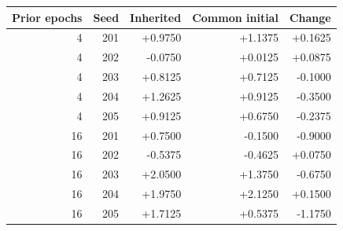 \begin{tabular}{rrrrr}
\toprule
Prior epochs & Seed & Inherited & Common initial & Change\\
\midrule
4 & 201 & +0.9750 & +1.1375 & +0.1625\\
4 & 202 & -0.0750 & +0.0125 & +0.0875\\
4 & 203 & +0.8125 & +0.7125 & -0.1000\\
4 & 204 & +1.2625 & +0.9125 & -0.3500\\
4 & 205 & +0.9125 & +0.6750 & -0.2375\\
16 & 201 & +0.7500 & -0.1500 & -0.9000\\
16 & 202 & -0.5375 & -0.4625 & +0.0750\\
16 & 203 & +2.0500 & +1.3750 & -0.6750\\
16 & 204 & +1.9750 & +2.1250 & +0.1500\\
16 & 205 & +1.7125 & +0.5375 & -1.1750\\
\bottomrule
\end{tabular}
